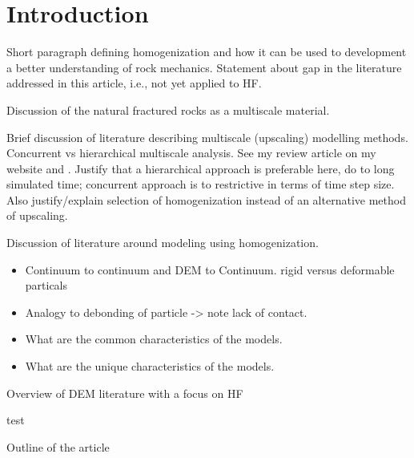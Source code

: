\section{Introduction}
Short paragraph defining homogenization and how it can be used to development a better understanding of rock mechanics.  Statement about gap in the literature addressed in this article, i.e., not yet applied to HF.

Discussion of the natural fractured rocks as a multiscale material.

Brief discussion of literature describing multiscale (upscaling)  modelling methods.  Concurrent vs hierarchical multiscale analysis.  See my review article on my website and \cite{Gracie_2011}. Justify that a hierarchical approach is preferable here, do to long simulated time; concurrent approach is to restrictive in terms of time step size. Also justify/explain selection of homogenization instead of an alternative method of upscaling.

Discussion of literature around modeling using homogenization.
\begin{itemize}
\item Continuum to continuum and DEM to Continuum. rigid versus deformable particals
\item Analogy to debonding of particle -> note lack of contact.
\item What are the common characteristics of the models.
\item What are the unique characteristics of the models.  
\end{itemize} 

Overview of DEM literature with a focus on HF

test

Outline of the article